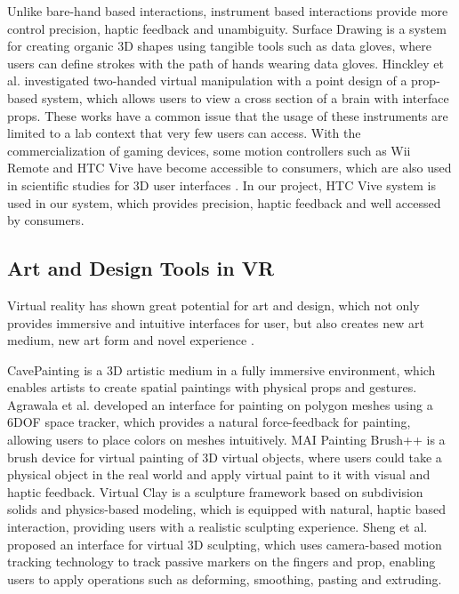 \documentclass{svjour3}                     %
\begin{document}
Unlike bare-hand based interactions, instrument based interactions provide more control precision, haptic feedback and unambiguity.
Surface Drawing \cite{schkolne2001surface} is a system for creating organic 3D shapes using tangible tools such as data gloves, where users can define strokes with the path of hands wearing data gloves.
Hinckley et al. \cite{hinckley1998two} investigated two-handed virtual manipulation with a point design of a prop-based system, which allows users to view a cross section of a brain with interface props.
These works have a common issue that the usage of these instruments are limited to a lab context that very few users can access.
%
With the commercialization of gaming devices, some motion controllers such as Wii Remote and HTC Vive have become accessible to consumers, which are also used in scientific studies for 3D user interfaces \cite{wingcrave2010wii,niehorster2017accuracy}.
%
In our project, HTC Vive system is used in our system, which provides precision, haptic feedback and well accessed by consumers.

\subsection{Art and Design Tools in VR}
\label{sec:2.2}
Virtual reality has shown great potential for art and design, which not only provides immersive and intuitive interfaces for user, but also creates new art medium, new art form and novel experience \cite{laviola20113d}.

CavePainting \cite{keefe2001cavepainting} is a 3D artistic medium in a fully immersive environment, which enables artists to create spatial paintings with physical props and gestures. Agrawala et al. \cite{agrawala19953d} developed an interface for painting on polygon meshes using a 6DOF space tracker, which provides a natural force-feedback for painting, allowing users to place colors on meshes intuitively. MAI Painting Brush++ \cite{otsuki2017brush} is a brush device for virtual painting of 3D virtual objects, where users could take a physical object in the real world and apply virtual paint to it with visual and haptic feedback.
Virtual Clay \cite{mcdonnell2001virtual} is a sculpture framework based on subdivision solids and physics-based modeling, which is equipped with natural, haptic based interaction, providing users with a realistic sculpting experience. Sheng et al. \cite{sheng2006interface} proposed an interface for virtual 3D sculpting, which uses camera-based motion tracking technology to track passive markers on the fingers and prop, enabling users to apply operations such as deforming, smoothing, pasting and extruding.
\end{document}
